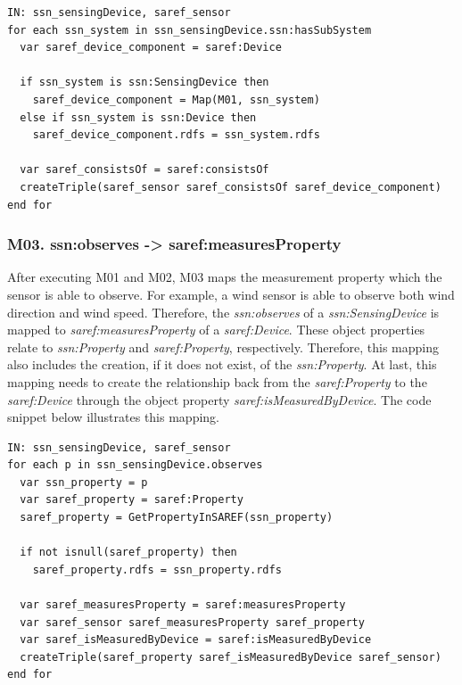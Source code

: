\documentclass{sig-alternate-05-2015}
\begin{document}
\begin{lstlisting}[caption={Pseudocode snippet for M02},label={code:sample},captionpos=b]
IN: ssn_sensingDevice, saref_sensor
for each ssn_system in ssn_sensingDevice.ssn:hasSubSystem 
  var saref_device_component = saref:Device 
  
  if ssn_system is ssn:SensingDevice then
    saref_device_component = Map(M01, ssn_system) 
  else if ssn_system is ssn:Device then 
    saref_device_component.rdfs = ssn_system.rdfs 
   
  var saref_consistsOf = saref:consistsOf 
  createTriple(saref_sensor saref_consistsOf saref_device_component)
end for
\end{lstlisting}

\subsubsection{M03. ssn:\-observes -> saref:\-measuresProperty}

After executing M01 and M02, M03 maps the measurement property which the sensor is able to observe. For example, a wind sensor is able to observe both wind direction and wind speed. Therefore, the \textit{ssn:\-observes} of a \textit{ssn:\-SensingDevice} is mapped to \textit{saref:\-measuresProperty} of a \textit{saref:\-Device}. These object properties relate to \textit{ssn:\-Property} and \textit{saref:\-Property}, respectively. Therefore, this mapping also includes the creation, if it does not exist, of the \textit{ssn:\-Property}. At last, this mapping needs to create the relationship back from the \textit{saref:\-Property} to the \textit{saref:\-Device} through the object property \textit{saref:\-isMeasuredByDevice}. The code snippet below illustrates this mapping. 

\begin{lstlisting}[caption={Pseudocode snippet for M03},label={code:sample},captionpos=b]
IN: ssn_sensingDevice, saref_sensor
for each p in ssn_sensingDevice.observes 
  var ssn_property = p
  var saref_property = saref:Property 
  saref_property = GetPropertyInSAREF(ssn_property)
    
  if not isnull(saref_property) then 
    saref_property.rdfs = ssn_property.rdfs 
 
  var saref_measuresProperty = saref:measuresProperty 
  var saref_sensor saref_measuresProperty saref_property 
  var saref_isMeasuredByDevice = saref:isMeasuredByDevice
  createTriple(saref_property saref_isMeasuredByDevice saref_sensor)
end for
\end{lstlisting}
\end{document}
